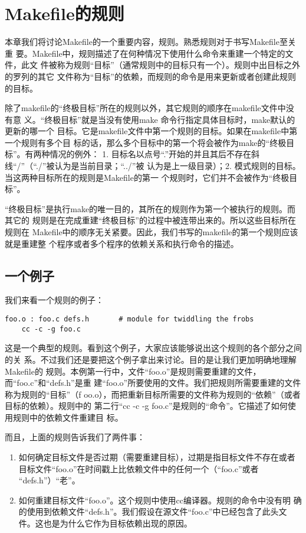 ﻿\chapter{Makefile的规则}
本章我们将讨论Makefile的一个重要内容，规则。熟悉规则对于书写Makefile至关重
要。Makefile中，规则描述了在何种情况下使用什么命令来重建一个特定的文件，此文
件被称为规则“目标”（通常规则中的目标只有一个）。规则中出目标之外的罗列的其它
文件称为“目标”的依赖，而规则的命令是用来更新或者创建此规则的目标。

除了makefile的“终极目标”所在的规则以外，其它规则的顺序在makefile文件中没有意
义。“终极目标”就是当没有使用make 命令行指定具体目标时，make默认的更新的哪一个
目标。它是makefile文件中第一个规则的目标。如果在makefile中第一个规则有多个目
标的话，那么多个目标中的第一个将会被作为make的“终极目标”。有两种情况的例外：
1. 目标名以点号“.”开始的并且其后不存在斜线“/”（“./”被认为是当前目录；“../”被
认为是上一级目录）；2. 模式规则的目标。当这两种目标所在的规则是Makefile的第一
个规则时，它们并不会被作为“终极目标”。

“终极目标”是执行make的唯一目的，其所在的规则作为第一个被执行的规则。而其它的
规则是在完成重建“终极目标”的过程中被连带出来的。所以这些目标所在规则在
Makefile中的顺序无关紧要。因此，我们书写的makefile的第一个规则应该就是重建整
个程序或者多个程序的依赖关系和执行命令的描述。

\section{一个例子}
我们来看一个规则的例子：
\begin{Verbatim}[]
foo.o : foo.c defs.h       # module for twiddling the frobs
    cc -c -g foo.c
\end{Verbatim}

这是一个典型的规则。看到这个例子，大家应该能够说出这个规则的各个部分之间的关
系。不过我们还是要把这个例子拿出来讨论。目的是让我们更加明确地理解Makefile的
规则。本例第一行中，文件“foo.o”是规则需要重建的文件，而“foo.c”和“defs.h”是重
建“foo.o”所要使用的文件。我们把规则所需要重建的文件称为规则的“目标”（f
oo.o），而把重新目标所需要的文件称为规则的“依赖”（或者目标的依赖）。规则中的
第二行“cc -c -g foo.c”是规则的“命令”。它描述了如何使用规则中的依赖文件重建目
标。

而且，上面的规则告诉我们了两件事：
\begin{enumerate}
\itemsep=0pt \parskip=0pt
 \item 如何确定目标文件是否过期（需要重建目标），过期是指目标文件不存在或者
     目标文件“foo.o”在时间戳上比依赖文件中的任何一个（“foo.c”或者
     “defs.h”）“老”。
 \item 如何重建目标文件“foo.o”。这个规则中使用cc编译器。规则的命令中没有明
     确的使用到依赖文件“defs.h”。我们假设在源文件“foo.c”中已经包含了此头文
     件。这也是为什么它作为目标依赖出现的原因。
\end{enumerate}

